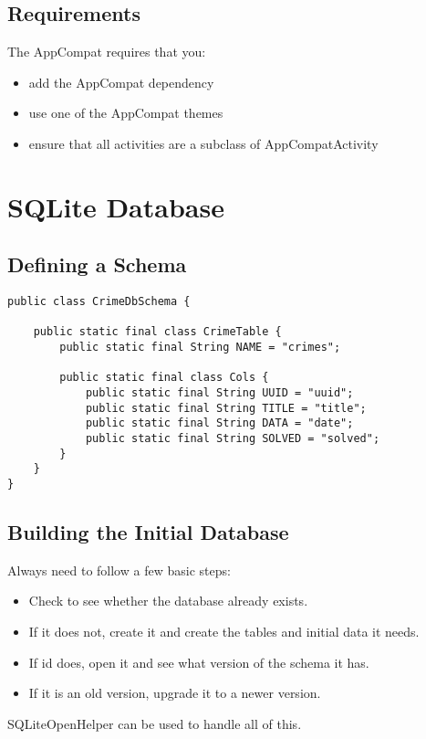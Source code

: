 \documentclass[]{article}
\begin{document}
\subsection{Requirements}
The AppCompat requires that you:
\begin{itemize}
	\item add the AppCompat dependency
	\item use one of the AppCompat themes 
	\item ensure that all activities are a subclass of AppCompatActivity
\end{itemize}

\section{SQLite Database}
\subsection{Defining a Schema}
\begin{lstlisting}
public class CrimeDbSchema {

	public static final class CrimeTable {
		public static final String NAME = "crimes";

		public static final class Cols {
			public static final String UUID = "uuid";
			public static final String TITLE = "title";
			public static final String DATA = "date";
			public static final String SOLVED = "solved";
		}
	}
}
\end{lstlisting}

\subsection{Building the Initial Database}
Always need to follow a few basic steps:
\begin{itemize}
	\item Check to see whether the database already exists.
	\item If it does not, create it and create the tables and initial data it needs.
	\item If id does, open it and see what version of the schema it has.
	\item If it is an old version, upgrade it to a newer version.
\end{itemize}
SQLiteOpenHelper can be used to handle all of this.
\end{document}
